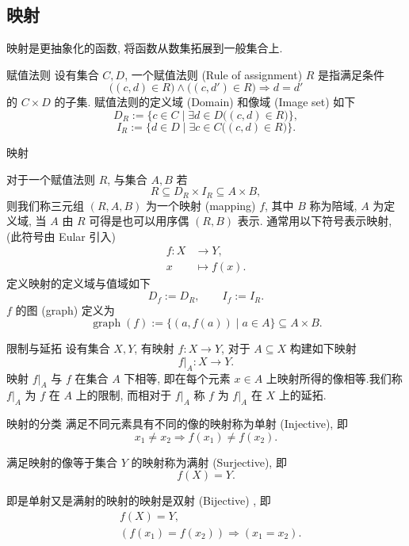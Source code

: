 \documentclass[cn,toc=twocol]{elegantbook}
\begin{document}
\subsection{映射}

映射是更抽象化的函数, 将函数从数集拓展到一般集合上.


\begin{definition}{赋值法则}
	设有集合 $C, D$, 一个赋值法则 (Rule of assignment) $R$ 是指满足条件
	\[
		\bigl((c, d) \in R \bigr) \land \bigl((c, d') \in R \bigr)\Rightarrow d = d'
	\]
	的 $C \times D$ 的子集. 赋值法则的定义域 (Domain) 和像域 (Image set) 如下
	\[
		D_R := \{c\in C\mid\exists d\in D \bigl((c,d) \in R\bigr)\}, 
	\]
	\[
		I_R := \{d\in D\mid\exists c\in C \bigl((c,d) \in R\bigr)\}.
	\]
\end{definition}

\begin{definition}{映射}

	对于一个赋值法则 $R$, 与集合 $A, B$ 若
	\[
		R \subseteq D_R \times I_R \subseteq A \times B,
	\]
	则我们称三元组 $(R, A, B)$ 为一个映射 (mapping) $f$, 其中 $B$ 称为陪域, $A$ 为定义域, 当 $A$ 由 $R$ 可得是也可以用序偶 $(R, B)$ 表示. 通常用以下符号表示映射, (此符号由 Eular 引入)
	\[
	\begin{aligned}
		f:X&\rightarrow Y,\\
		x&\mapsto f(x).
	\end{aligned}
	\]
	定义映射的定义域与值域如下
	\[
		D_f := D_R,\qquad I_f := I_R.
	\]
	$f$ 的图 (graph) 定义为
	\[
		\operatorname{graph}(f) := \{(a,f(a))\mid a \in A\} \subseteq A \times B.
	\]
\end{definition}

\begin{definition}{限制与延拓}
设有集合 $X, Y$, 有映射 $f:X\to Y$, 对于 $A \subseteq X$ 构建如下映射
\[
	f|_A : X\to Y.
\]
映射 $f|_A$ 与 $f$ 在集合 $A$ 下相等, 即在每个元素 $x\in A$ 上映射所得的像相等.我们称 $f|_A$ 为 $f$ 在 $A$ 上的限制, 而相对于 $f|_A$ 称 $f$ 为 $f|_A$ 在 $X$ 上的延拓.
\end{definition}

\begin{definition}{映射的分类}
满足不同元素具有不同的像的映射称为单射 (Injective), 即
\[
	x_1 \ne x_2 \Rightarrow f(x_1) \ne f(x_2).
\]

满足映射的像等于集合 $Y$ 的映射称为满射 (Surjective), 即
\[
	f(X)=Y.
\]

即是单射又是满射的映射的映射是双射 (Bijective) , 即
\[
\begin{aligned}
	&f(X)=Y,\\
	&(f(x_1) = f(x_2)) \Rightarrow(x_1=x_2).
\end{aligned}
\]
\end{definition}
\end{document}
